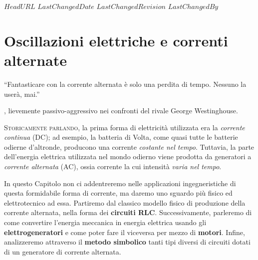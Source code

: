 \svnidlong
{$HeadURL$}
{$LastChangedDate$}
{$LastChangedRevision$}
{$LastChangedBy$}

\chapter{Oscillazioni elettriche e correnti alternate}
\begin{introduction}
	``Fantasticare con la corrente alternata è solo una perdita di tempo. Nessuno la userà, mai.''
	\begin{flushright}
		, lievemente passivo-aggressivo nei confronti del rivale George Westinghouse.
	\end{flushright}
\end{introduction}
\lettrine[findent=1pt, nindent=0pt]{S}{toricamente parlando}, la prima forma di elettricità utilizzata era la \textit{corrente continua} (DC); ad esempio, la batteria di Volta, come quasi tutte le batterie odierne d'altronde, producono una corrente \textit{costante nel tempo}. Tuttavia, la parte dell'energia elettrica utilizzata nel mondo odierno viene prodotta da generatori a \textit{corrente alternata} (AC), ossia corrente la cui intensità \textit{varia nel tempo}.

In questo Capitolo non ci addentreremo nelle applicazioni ingegneristiche di questa formidabile forma di corrente, ma daremo uno sguardo più fisico ed elettrotecnico ad essa. Partiremo dal classico modello fisico di produzione della corrente alternata, nella forma dei \textbf{circuiti RLC}. Successivamente, parleremo di come convertire l'energia meccanica in energia elettrica usando gli \textbf{elettrogeneratori} e come poter fare il viceversa per mezzo di \textbf{motori}. Infine, analizzeremo attraverso il \textbf{metodo simbolico} tanti tipi diversi di circuiti dotati di un generatore di corrente alternata.
